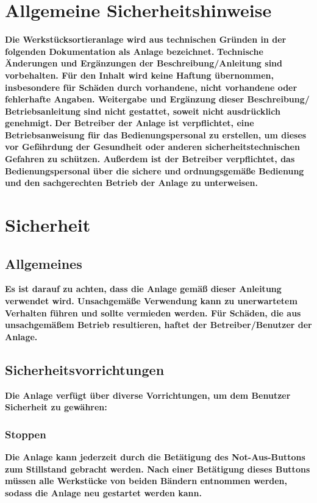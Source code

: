\documentclass[oneside,a4paper,titlepage]{scrartcl} %
\begin{document}
\newpage
\section{Allgemeine Sicherheitshinweise}
\textbf{\newline Die Werkstücksortieranlage wird aus technischen Gründen in der folgenden Dokumentation als Anlage bezeichnet.\newline}
\textbf{Technische Änderungen und Ergänzungen der      Beschreibung/Anleitung sind vorbehalten. \newline
Für den Inhalt wird keine Haftung übernommen, insbesondere für Schäden durch vorhandene, nicht 
vorhandene oder fehlerhafte Angaben. \newline
Weitergabe und Ergänzung dieser Beschreibung/ Betriebsanleitung sind nicht gestattet, soweit nicht    ausdrücklich genehmigt.\newline}
\textbf{Der Betreiber der Anlage ist verpflichtet, eine Betriebsanweisung für das Bedienungspersonal zu erstellen, um dieses vor Gefährdung der Gesundheit oder anderen sicherheitstechnischen Gefahren zu schützen. Außerdem ist der Betreiber verpflichtet, das Bedienungspersonal über die sichere und ordnungsgemäße Bedienung und den sachgerechten Betrieb der Anlage zu unterweisen.}
\newpage 

\section{Sicherheit}
\subsection{Allgemeines}
\textbf{Es ist darauf zu achten, dass die Anlage gemäß dieser Anleitung verwendet wird. Unsachgemäße Verwendung
kann zu unerwartetem Verhalten führen und sollte vermieden werden. Für Schäden, die aus unsachgemäßem Betrieb resultieren, haftet der Betreiber/Benutzer der Anlage.}

\subsection{Sicherheitsvorrichtungen}
\textbf{Die Anlage verfügt über diverse Vorrichtungen, um dem Benutzer Sicherheit zu gewähren:}

\subsubsection{Stoppen}
\textbf{Die Anlage kann jederzeit durch die Betätigung des Not-Aus-Buttons zum Stillstand gebracht werden.\newline
Nach einer Betätigung dieses Buttons müssen alle Werkstücke von beiden Bändern entnommen werden, sodass die Anlage neu gestartet werden kann.}
\end{document}
